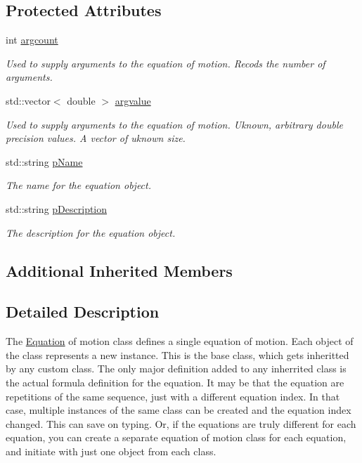 \subsection*{Protected Attributes}
\begin{DoxyCompactItemize}
\item 
int \hyperlink{classosea_1_1ofreq_1_1_equationof_motion_a13a15811fd575ac0fccf0d463218657b}{argcount}
\begin{DoxyCompactList}\small\item\em Used to supply arguments to the equation of motion. Recods the number of arguments. \end{DoxyCompactList}\item 
std\-::vector$<$ double $>$ \hyperlink{classosea_1_1ofreq_1_1_equationof_motion_a1a9bf7f3460368c102aa8d4edec9b500}{argvalue}
\begin{DoxyCompactList}\small\item\em Used to supply arguments to the equation of motion. Uknown, arbitrary double precision values. A vector of uknown size. \end{DoxyCompactList}\item 
std\-::string \hyperlink{classosea_1_1ofreq_1_1_equationof_motion_a5848a1ad14d31556fd1b62b4e3de3643}{p\-Name}
\begin{DoxyCompactList}\small\item\em The name for the equation object. \end{DoxyCompactList}\item 
std\-::string \hyperlink{classosea_1_1ofreq_1_1_equationof_motion_aa6ce10dacd47441d445a9170bd355792}{p\-Description}
\begin{DoxyCompactList}\small\item\em The description for the equation object. \end{DoxyCompactList}\end{DoxyCompactItemize}
\subsection*{Additional Inherited Members}


\subsection{Detailed Description}
The \hyperlink{classosea_1_1ofreq_1_1_equation}{Equation} of motion class defines a single equation of motion. Each object of the class represents a new instance. This is the base class, which gets inheritted by any custom class. The only major definition added to any inherrited class is the actual formula definition for the equation. It may be that the equation are repetitions of the same sequence, just with a different equation index. In that case, multiple instances of the same class can be created and the equation index changed. This can save on typing. Or, if the equations are truly different for each equation, you can create a separate equation of motion class for each equation, and initiate with just one object from each class.

